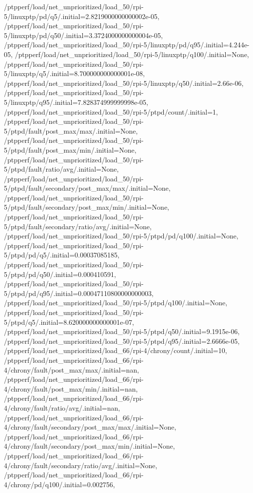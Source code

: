 {    /ptpperf/load/net_unprioritized/load_50/rpi-5/linuxptp/pd/q5/.initial=2.8219000000000002e-05,
    /ptpperf/load/net_unprioritized/load_50/rpi-5/linuxptp/pd/q50/.initial=3.3724000000000004e-05,
    /ptpperf/load/net_unprioritized/load_50/rpi-5/linuxptp/pd/q95/.initial=4.244e-05,
    /ptpperf/load/net_unprioritized/load_50/rpi-5/linuxptp/q100/.initial=None,
    /ptpperf/load/net_unprioritized/load_50/rpi-5/linuxptp/q5/.initial=8.700000000000001e-08,
    /ptpperf/load/net_unprioritized/load_50/rpi-5/linuxptp/q50/.initial=2.66e-06,
    /ptpperf/load/net_unprioritized/load_50/rpi-5/linuxptp/q95/.initial=7.828374999999998e-05,
    /ptpperf/load/net_unprioritized/load_50/rpi-5/ptpd/count/.initial=1,
    /ptpperf/load/net_unprioritized/load_50/rpi-5/ptpd/fault/post_max/max/.initial=None,
    /ptpperf/load/net_unprioritized/load_50/rpi-5/ptpd/fault/post_max/min/.initial=None,
    /ptpperf/load/net_unprioritized/load_50/rpi-5/ptpd/fault/ratio/avg/.initial=None,
    /ptpperf/load/net_unprioritized/load_50/rpi-5/ptpd/fault/secondary/post_max/max/.initial=None,
    /ptpperf/load/net_unprioritized/load_50/rpi-5/ptpd/fault/secondary/post_max/min/.initial=None,
    /ptpperf/load/net_unprioritized/load_50/rpi-5/ptpd/fault/secondary/ratio/avg/.initial=None,
    /ptpperf/load/net_unprioritized/load_50/rpi-5/ptpd/pd/q100/.initial=None,
    /ptpperf/load/net_unprioritized/load_50/rpi-5/ptpd/pd/q5/.initial=0.00037085185,
    /ptpperf/load/net_unprioritized/load_50/rpi-5/ptpd/pd/q50/.initial=0.000410591,
    /ptpperf/load/net_unprioritized/load_50/rpi-5/ptpd/pd/q95/.initial=0.00047110800000000003,
    /ptpperf/load/net_unprioritized/load_50/rpi-5/ptpd/q100/.initial=None,
    /ptpperf/load/net_unprioritized/load_50/rpi-5/ptpd/q5/.initial=8.620000000000001e-07,
    /ptpperf/load/net_unprioritized/load_50/rpi-5/ptpd/q50/.initial=9.1915e-06,
    /ptpperf/load/net_unprioritized/load_50/rpi-5/ptpd/q95/.initial=2.6666e-05,
    /ptpperf/load/net_unprioritized/load_66/rpi-4/chrony/count/.initial=10,
    /ptpperf/load/net_unprioritized/load_66/rpi-4/chrony/fault/post_max/max/.initial=nan,
    /ptpperf/load/net_unprioritized/load_66/rpi-4/chrony/fault/post_max/min/.initial=nan,
    /ptpperf/load/net_unprioritized/load_66/rpi-4/chrony/fault/ratio/avg/.initial=nan,
    /ptpperf/load/net_unprioritized/load_66/rpi-4/chrony/fault/secondary/post_max/max/.initial=None,
    /ptpperf/load/net_unprioritized/load_66/rpi-4/chrony/fault/secondary/post_max/min/.initial=None,
    /ptpperf/load/net_unprioritized/load_66/rpi-4/chrony/fault/secondary/ratio/avg/.initial=None,
    /ptpperf/load/net_unprioritized/load_66/rpi-4/chrony/pd/q100/.initial=0.002756,
}
